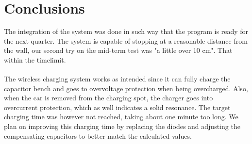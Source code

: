 \documentclass[final]{scrreprt} %
\begin{document}
\chapter{Conclusions}

The integration of the system was done in such way that the program is ready for the next quarter.
The system is capable of stopping at a reasonable distance from the wall, our second try on the mid-term test was "a little over 10 cm".
That within the timelimit.
\\ \\
The wireless charging system works as intended since it can fully charge the capacitor bench and goes to overvoltage protection when being overcharged.
Also, when the car is removed from the charging spot, the charger goes into overcurrent protection, which as well indicates a solid resonance.
The target charging time was however not reached, taking about one minute too long.
We plan on improving this charging time by replacing the diodes and adjusting the compensating capacitors to better match the calculated values.
\end{document}
